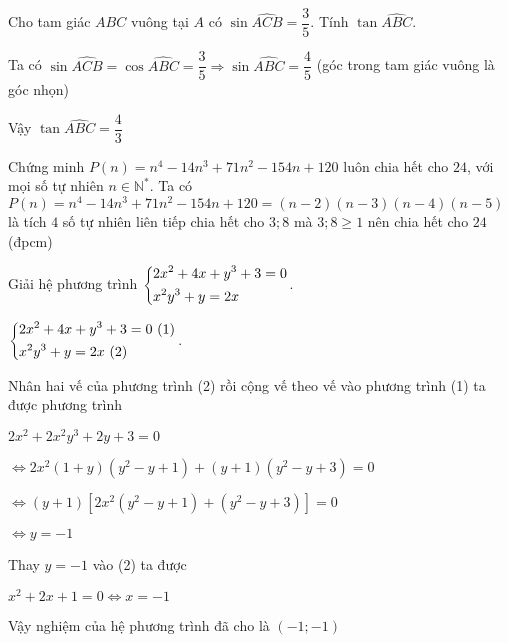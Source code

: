 \begin{ex}%
   Cho tam giác $ABC$ vuông tại $A$ có $\sin \widehat{ACB}=\dfrac{3}{5}$. Tính $\tan \widehat{ABC}$.
    
\loigiai
    { Ta có $\sin \widehat{ACB}=\cos \widehat{ABC}=\dfrac{3}{5} \Rightarrow \sin \widehat{ABC}=\dfrac{4}{5}$ (góc trong tam giác vuông là góc nhọn)
    
    
    Vậy $\tan \widehat{ABC} =\dfrac{4}{3}$
    }
\end{ex}

\begin{ex}%
   Chứng minh $P(n)=n^4-14n^3+71n^2-154n+120$ luôn chia hết cho $24$, với mọi số tự nhiên $n\in \mathbb{N^*}$.
\loigiai
    {
    Ta có $P(n)=n^4-14n^3+71n^2-154n+120=(n-2)(n-3)(n-4)(n-5)$ là tích $4$ số tự nhiên liên tiếp chia hết cho $3;8$ mà $3;8 \geq 1$ nên chia hết cho $24$  (đpcm)  }
\end{ex}
\begin{ex}%
Giải hệ phương trình $\left\{\begin{aligned}&2x^2+4x+y^3+3=0\\&x^2y^3+y=2x\end{aligned}\right.$.
	\loigiai
	{$\heva{&2x^2+4x+y^3+3=0\ (1)\\&x^2y^3+y=2x\ (2)}$. 
		
		Nhân hai vế của phương trình (2) rồi cộng vế theo vế vào phương trình (1) ta được phương trình
		
		$2x^2+2x^2y^3+2y+3=0$
		
		$\Leftrightarrow 2x^2(1+y)(y^2-y+1)+(y+1)(y^2-y+3)=0$
		
		$\Leftrightarrow (y+1)[2x^2(y^2-y+1)+(y^2-y+3)]=0$
		
		$\Leftrightarrow y=-1$
		
		Thay $y=-1$ vào (2) ta được
		
		$x^2+2x+1=0  \Leftrightarrow x=-1$
		
		Vậy nghiệm của hệ phương trình đã cho là $(-1;-1)$
	}
\end{ex}
